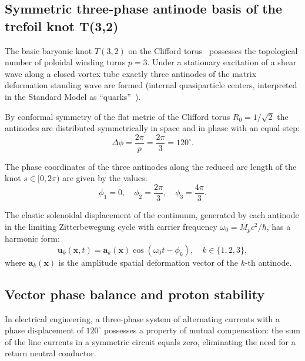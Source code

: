 \documentclass[11pt,a4paper]{article}
\theoremstyle{definition}
\theoremstyle{remark}
\begin{document}
\subsection{Symmetric three-phase antinode basis of the trefoil knot T(3,2)}

The basic baryonic knot $T(3,2)$ on the Clifford torus~\cite{Skyrme1962,FaddeevNiemi1997} possesses the topological number of poloidal winding turns $p=3$. Under a stationary excitation of a shear wave along a closed vortex tube exactly three antinodes of the matrix deformation standing wave are formed (internal quasiparticle centers, interpreted in the Standard Model as ``quarks''~\cite{JuliaZee1975}).

By conformal symmetry of the flat metric of the Clifford torus $R_0 = 1/\sqrt{2}$ the antinodes are distributed symmetrically in space and in phase with an equal step:
\begin{equation}
	\Delta\phi = \frac{2\pi}{p} = \frac{2\pi}{3} = 120^\circ.
	\label{eq:three_phase_shift_step}
\end{equation}

The phase coordinates of the three antinodes along the reduced arc length of the knot $s \in [0, 2\pi)$ are given by the values:
\begin{equation}
	\phi_1 = 0, \quad \phi_2 = \frac{2\pi}{3}, \quad \phi_3 = \frac{4\pi}{3}.
	\label{eq:three_phase_coords}
\end{equation}

The elastic solenoidal displacement of the continuum, generated by each antinode in the limiting Zitterbewegung cycle with carrier frequency $\omega_0 = M_p c^2 / \hbar$, has a harmonic form:
\begin{equation}
	\mathbf{u}_k(\mathbf{x}, t) = \mathbf{a}_k(\mathbf{x}) \cos\left(\omega_0 t - \phi_k\right), \quad k \in \{1, 2, 3\},
	\label{eq:three_phase_displacements}
\end{equation}
where $\mathbf{a}_k(\mathbf{x})$ is the amplitude spatial deformation vector of the $k$-th antinode.

\subsection{Vector phase balance and proton stability}

In electrical engineering, a three-phase system of alternating currents with a phase displacement of $120^\circ$ possesses a property of mutual compensation: the sum of the line currents in a symmetric circuit equals zero, eliminating the need for a return neutral conductor.
\end{document}
